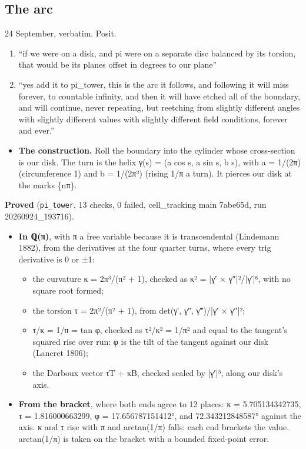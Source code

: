 \subsection{\texorpdfstring{The arc}{The arc}}

24 September, verbatim. Posit.

\begin{enumerate}
\item “if we were on a disk, and pi were on a separate disc balanced by its torsion, that would be its planes offset in degrees to our plane”
\item “yes add it to pi\_\allowbreak{}tower, this is the arc it follows, and following it will miss forever, to countable infinity, and then it will have etched all of the boundary, and will continue, never repeating, but reetching from slightly different angles with slightly different values with slightly different field conditions, forever and ever.”
\end{enumerate}

\begin{itemize}
\item \textbf{The construction.} Roll the boundary into the cylinder whose cross-section is our disk. The turn is the helix γ(s) = (a cos s, a sin s, b s), with a = 1/(2π) (circumference 1) and b = 1/(2π²) (rising 1/π a turn). It pierces our disk at the marks \{nπ\}.
\end{itemize}

\textbf{Proved} (\texttt{pi\_\allowbreak{}tower}, 13 checks, 0 failed, cell\_\allowbreak{}tracking main 7abe65d, run 20260924\_\allowbreak{}193716).

\begin{itemize}
\item \textbf{In ℚ(π)}, with π a free variable because it is transcendental (Lindemann 1882), from the derivatives at the four quarter turns, where every trig derivative is 0 or ±1:

\begin{itemize}
\item the curvature κ = 2π³/(π² + 1), checked as κ² = |γ′ × γ″|²/|γ′|⁶, with no square root formed;
\item the torsion τ = 2π²/(π² + 1), from det(γ′, γ″, γ‴)/|γ′ × γ″|²;
\item τ/κ = 1/π = tan φ, checked as τ²/κ² = 1/π² and equal to the tangent's squared rise over run: φ is the tilt of the tangent against our disk (Lancret 1806);
\item the Darboux vector τT + κB, checked scaled by |γ′|³, along our disk's axis.
\end{itemize}
\item \textbf{From the bracket}, where both ends agree to 12 places: κ = 5.705134342735, τ = 1.816000663299, φ = 17.656787151412°, and 72.343212848587° against the axis. κ and τ rise with π and arctan(1/π) falls: each end brackets the value. arctan(1/π) is taken on the bracket with a bounded fixed-point error.
\end{itemize}

